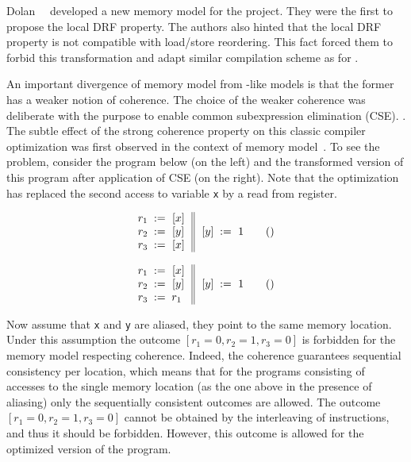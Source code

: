 Dolan~\etal~\cite{Dolan-al:PLDI18} developed a new 
memory model for the \MOCaml project. 
They were the first to propose the local DRF property. 
The authors also hinted that the local DRF property 
is not compatible with load/store reordering.
This fact forced them to forbid this transformation
and adapt similar compilation scheme as for \RCMM. 

An important divergence of \OCaml memory model 
from \CMM-like models is that the former 
has a weaker notion of coherence.
The choice of the weaker coherence was deliberate 
with the purpose to enable common subexpression elimination (CSE).
.
The subtle effect of the strong coherence property 
on this classic compiler optimization was first 
observed in the context of \Java 
memory model~\cite{Pugh:JAVA99}.
To see the problem, consider the program below
(on the left) and the transformed version 
of this program after application of CSE (on the right).
Note that the optimization has replaced 
the second access to variable \texttt{x}
by a read from register. 

\begin{minipage}{0.5\linewidth}
\begin{equation*}
\inarrII{
  \readInst{}{r_1}{x}      \\
  \readInst{}{r_2}{y}      \\
  \readInst{}{r_3}{x}      \\
}{
  \writeInst{}{y}{1}       \\
}
\tag{}\label{ex:coh-rr}
\end{equation*}
\end{minipage}
%
\begin{minipage}{0.5\linewidth}
\begin{equation*}
\inarrII{
  \readInst{}{r_1}{x}      \\
  \readInst{}{r_2}{y}      \\
  \assignInst{r_3}{r_1}    \\
}{
  \writeInst{}{y}{1}       \\
}
\tag{}\label{ex:coh-rr}
\end{equation*}
\end{minipage}

Now assume that \texttt{x} and \texttt{y} are aliased,
\ie they point to the same memory location.
Under this assumption the outcome $[r_1=0, r_2=1, r_3=0]$
is forbidden for the memory model respecting coherence.
Indeed, the coherence guarantees sequential consistency per location, 
which means that for the programs consisting of accesses 
to the single memory location 
(as the one above in the presence of aliasing) 
only the sequentially consistent outcomes are allowed.
The outcome $[r_1=0, r_2=1, r_3=0]$ cannot be obtained 
by the interleaving of instructions, and thus 
it should be forbidden.  
However, this outcome is allowed for 
the optimized version of the program. 


